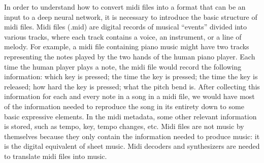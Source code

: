 \documentclass[12pt,oneside]{chicagocapstone}
\begin{document}
In order to understand how to convert midi files into a format that can be an input to a deep neural network, it is necessary to introduce the basic structure of midi files. Midi files (.mid) are digital records of musical ``events'' divided into various tracks, where each track contains a voice, an instrument, or a line of melody. For example, a midi file containing piano music might have two tracks representing the notes played by the two hands of the human piano player. Each time the human player plays a note, the midi file would record the following information: which key is pressed; the time the key is pressed; the time the key is released; how hard the key is pressed; what the pitch bend is. After collecting this information for each and every note in a song in a midi file, we would have most of the information needed to reproduce the song in its entirety down to some basic expressive elements. In the midi metadata, some other relevant information is stored, such as tempo, key, tempo changes, etc. Midi files are not music by themselves because they only contain the information needed to produce music: it is the digital equivalent of sheet music. Midi decoders and synthesizers are needed to translate midi files into music.
\end{document}
